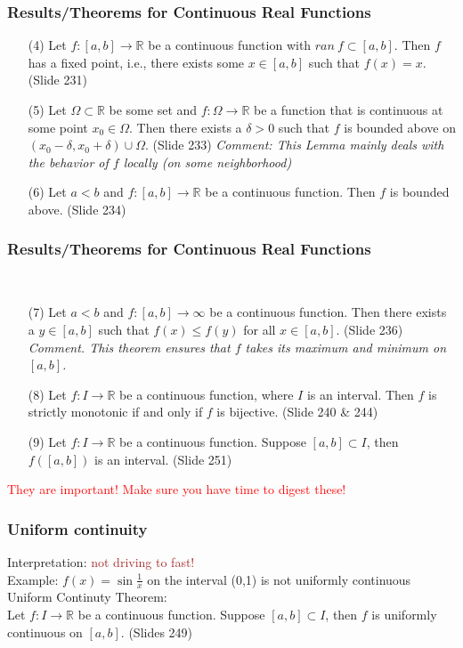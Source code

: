 \documentclass{beamer}
\newcommand{\myfont}{\rmfamily\normalsize\upshape\mdseries}
\begin{document}
\begin{frame}
    \frametitle{Results/Theorems for Continuous Real Functions}
    \begin{itemize}
        \item[(4)] Let $f:[a,b]\to \mathbb{R}$ be a continuous function with $ran~f\subset[a,b]$. 
        Then $f$ has a fixed point, i.e., there exists some $x \in [a,b]$ such that $f(x)=x$. (Slide 231) 
        \item[(5)] Let $\Omega \subset \mathbb{R}$ be some set and $𝑓:\Omega\to \mathbb{R}$ be a function 
        that is continuous at some point $x_0 \in \Omega$. Then there exists a $\delta > 0$ such that 
        $f$ is bounded above on $(x_0-\delta,x_0+\delta)\cup\Omega$. (Slide 233) 
        \itshape Comment: This Lemma mainly deals with the behavior of $f$ locally (on some neighborhood) 
        \myfont
        \item[(6)] Let $a < b$ and $f:[a,b]\to \mathbb{R}$ be a continuous function. 
        Then $f$ is bounded above. (Slide 234) 
    \end{itemize}
\end{frame}
\begin{frame}
    \frametitle{Results/Theorems for Continuous Real Functions}\
    \begin{itemize}
        \item[(7)] Let $a < b$ and $f:[a,b]\to \infty$ be a continuous function. 
        Then there exists a $y \in [a,b]$ such that $f(x)\leq f(y)$ for all $x \in [a,b]$. (Slide 236) 
        \itshape Comment. This theorem ensures that $f$ takes its maximum and minimum on $[a,b]$. \myfont
        \item[(8)] Let $f:I \to \mathbb{R}$ be a continuous function, where $I$ is an interval. 
        Then $f$ is strictly monotonic if and only if $f$ is bijective. (Slide 240 \& 244) 
        \item[(9)] Let $f:I\to \mathbb{R}$ be a continuous function. Suppose $[a,b]\subset I$, then $f([a,b])$ is an interval. (Slide 251)
    \end{itemize}
    \vspace{1em}
    \textcolor{red}{They are important! Make sure you have time to digest these!}
\end{frame}
\begin{frame}
    \frametitle{Uniform continuity}
    Interpretation: \textcolor{brown}{not driving to fast!}\\ 
    Example: $f(x)=\sin \frac{1}{x}$ on the interval (0,1) is not uniformly continuous
    \vspace{2em}\\
    Uniform Continuty Theorem:\\
    Let $f:I\to\mathbb{R}$ be a continuous function. 
    Suppose $[a,b]\subset I$, then $f$ is uniformly continuous on $[a,b]$.  (Slides 249)

\end{frame}
\end{document}
